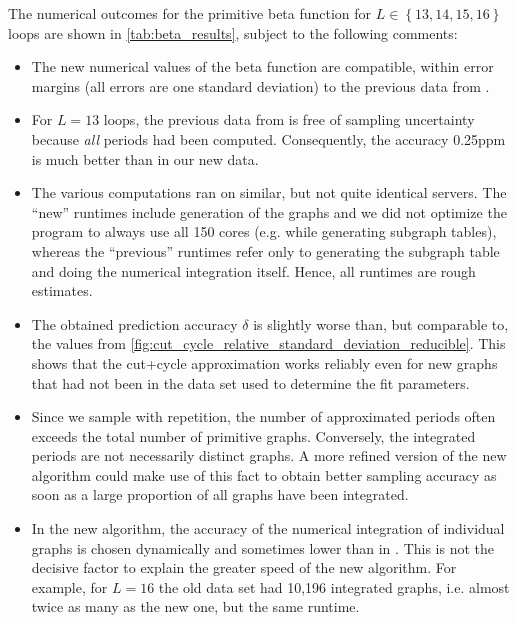\documentclass[11pt]{scrartcl}
\numberwithin{equation}{section}
\begin{document}
The numerical outcomes for the primitive beta function for $L\in \left \lbrace 13,14,15,16 \right \rbrace $ loops are shown in \cref{tab:beta_results}, subject to the following comments:
\begin{itemize}
	\item The new numerical values of the beta function are compatible, within error margins (all errors are one standard deviation) to the previous data from \cite{balduf_statistics_2023}.
	\item For $L=13$ loops, the previous data from \cite{balduf_statistics_2023} is free of sampling uncertainty because \emph{all} periods had been computed. Consequently, the accuracy 0.25ppm is much better than in our new data.
	\item The various computations ran on similar, but not quite identical  servers. The \enquote{new} runtimes include generation of the graphs and we did not optimize the program to always use all 150 cores (e.g. while generating subgraph tables), whereas the \enquote{previous} runtimes  refer only to generating the subgraph table and doing the numerical integration itself. Hence, all runtimes are rough estimates.
	\item The obtained prediction accuracy $\delta$ is slightly worse than, but comparable to, the values from \cref{fig:cut_cycle_relative_standard_deviation_reducible}. This shows that the cut+cycle approximation works reliably even for new graphs that had not been in the data set used to determine the fit parameters.
	\item Since we sample with repetition, the number of approximated periods often exceeds the total number of primitive graphs.   Conversely, the integrated periods are not necessarily distinct graphs. A more refined version of the new algorithm could make use of this fact to obtain better sampling accuracy  as soon as a large proportion of all graphs have been integrated.
	\item In the new algorithm, the accuracy of the numerical integration of individual graphs is chosen dynamically and sometimes lower than in \cite{balduf_statistics_2023}. This   is not the decisive factor to explain the greater speed of the new algorithm. For example, for $L=16$ the old data set had 10,196 integrated graphs, i.e. almost twice as many as the new one, but the same runtime. 
\end{itemize}
\end{document}
